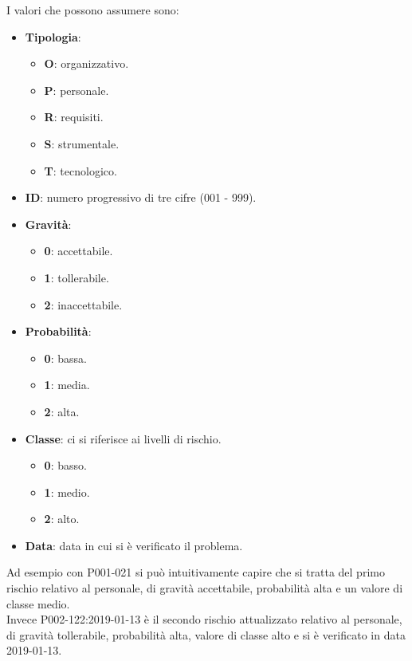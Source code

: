 			I valori che possono assumere sono:

			\begin{itemize}
				\item \textbf{Tipologia}:
				\begin{itemize}
					\item \textbf{O}: organizzativo.
					\item \textbf{P}: personale.
					\item \textbf{R}: requisiti.
					\item \textbf{S}: strumentale.
					\item \textbf{T}: tecnologico.
				\end{itemize}
				\item \textbf{ID}: numero progressivo di tre cifre (001 - 999).
				\item \textbf{Gravità}:
				\begin{itemize}
					\item \textbf{0}: accettabile.
					\item \textbf{1}: tollerabile.
					\item \textbf{2}: inaccettabile.
				\end{itemize}

				\item \textbf{Probabilità}:
				\begin{itemize}
					\item \textbf{0}: bassa.
					\item \textbf{1}: media.
					\item \textbf{2}: alta.
				\end{itemize}

				\item \textbf{Classe}: ci si riferisce ai livelli di rischio.
				\begin{itemize}
					\item \textbf{0}: basso.
					\item \textbf{1}: medio.
					\item \textbf{2}: alto.
				\end{itemize}

				\item \textbf{Data}: data in cui si è verificato il problema.
			\end{itemize}

			Ad esempio con P001-021 si può intuitivamente capire che si tratta del primo rischio relativo al personale, di gravità accettabile,
			probabilità alta e un valore di classe medio.\\
			Invece P002-122:2019-01-13 è il secondo rischio attualizzato relativo al personale, di gravità tollerabile, probabilità alta, valore di classe alto e si è verificato in data 2019-01-13.
            
